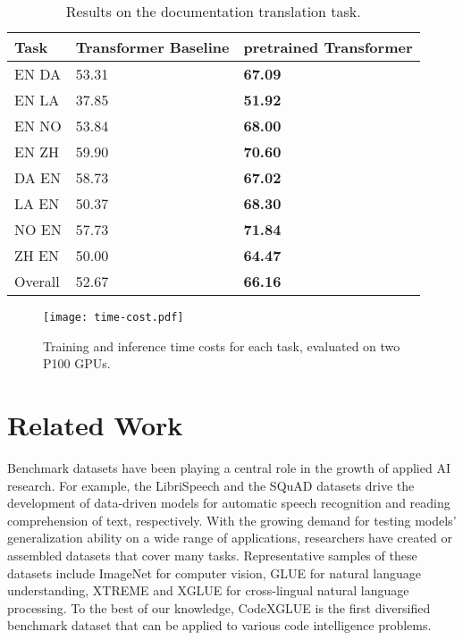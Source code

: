 \documentclass[sigconf,nonacm,screen]{acmart}
\begin{document}
\begin{table}[t]
	\begin{center}
	\caption{Results on the documentation translation task.}
		\begin{tabular}{lp{2cm}<{\centering}p{2cm}<{\centering}} 
			 \toprule 
			Task & Transformer Baseline & pretrained
			Transformer \\
\midrule
			EN  DA  & 53.31     &  \textbf{67.09}  \\
			EN  LA  & 37.85     &  \textbf{51.92}  \\
			EN  NO  & 53.84    &  \textbf{68.00}  \\
			EN  ZH  & 59.90     &  \textbf{70.60}  \\
			 \midrule
			DA  EN  & 58.73     &  \textbf{67.02}  \\
			LA  EN  & 50.37     &  \textbf{68.30}  \\
			NO  EN  & 57.73     &  \textbf{71.84}  \\
			ZH  EN  & 50.00     &  \textbf{64.47}  \\
			 \midrule
			Overall    & 52.67     &  \textbf{66.16}  \\
			\bottomrule
		\end{tabular}
	\label{documentation-translation-result}
	\end{center}
\end{table}


\begin{figure*}
    \centering
    \texttt{[image: time-cost.pdf]}
    \caption{Training and inference time costs for each task, evaluated on two P100 GPUs.}
    \label{fig:time}
\end{figure*}


\section{Related Work}
Benchmark datasets have been playing a central role in the growth of applied AI research. 
For example, the LibriSpeech \cite{panayotov2015librispeech} 
and the SQuAD \cite{rajpurkar2016squad} datasets
drive the development of data-driven models for automatic speech recognition and reading comprehension of text, respectively.
With the growing demand for testing models' generalization ability on a wide range of applications, researchers have created or assembled datasets that cover many tasks. Representative samples of these datasets include ImageNet \cite{deng2009imagenet} for computer vision, GLUE \cite{wang2018glue} for natural language understanding, XTREME \cite{hu2020xtreme} and XGLUE \cite{liang2020xglue} for cross-lingual natural language processing. To the best of our knowledge, CodeXGLUE is the first diversified benchmark dataset that can be applied to various code intelligence problems.
\end{document}
